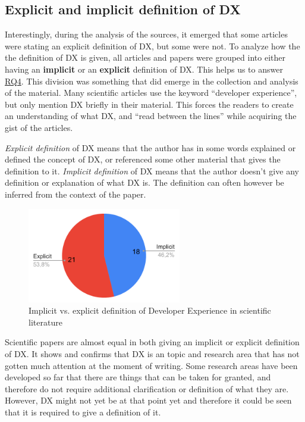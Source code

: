 \documentclass[english, 12pt, a4paper, sci, utf8, a-1b, online]{aaltothesis}
\begin{document}
\subsection{Explicit and implicit definition of DX}

Interestingly, during the analysis of the sources, it emerged that some articles were stating an explicit definition of DX, but some were not. To analyze how the the definition of DX is given, all articles and papers were grouped into either having an \textbf{implicit} or an \textbf{explicit} definition of DX. This helps us to answer \hyperref[RQ4]{RQ4}. This division was something that did emerge in the collection and analysis of the material. Many scientific articles use the keyword ``developer experience'', but only mention DX briefly in their material. This forces the readers to create an understanding of what DX, and ``read between the lines'' while acquiring the gist of the articles.

\textit{Explicit definition} of DX means that the author has in some words explained or defined the concept of DX, or referenced some other material that gives the definition to it. \textit{Implicit definition} of DX means that the author doesn't give any definition or explanation of what DX is. The definition can often however be inferred from the context of the paper.

\begin{figure}[ht]
  \begin{center}
    \includegraphics[width=0.6\textwidth]{definition-scientific.pdf}
  \end{center}
  \captionsetup{width=0.6\textwidth}
  \caption{Implicit vs. explicit definition of Developer Experience in scientific literature}
\end{figure}

Scientific papers are almost equal in both giving an implicit or explicit definition of DX. It shows and confirms that DX is an topic and research area that has not gotten much attention at the moment of writing. Some research areas have been developed so far that there are things that can be taken for granted, and therefore do not require additional clarification or definition of what they are. However, DX might not yet be at that point yet and therefore it could be seen that it is required to give a definition of it.
\end{document}
